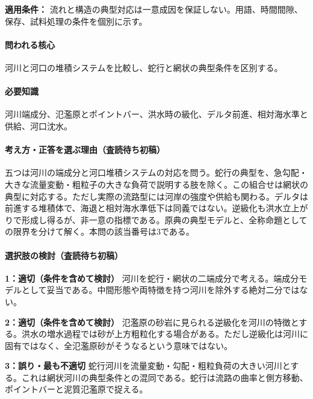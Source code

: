 \noindent\textbf{適用条件：} 流れと構造の典型対応は一意成因を保証しない。用語、時間間隙、保存、試料処理の条件を個別に示す。\par

\paragraph{問われる核心} 河川と河口の堆積システムを比較し、蛇行と網状の典型条件を区別する。

\paragraph{必要知識} 河川端成分、氾濫原とポイントバー、洪水時の級化、デルタ前進、相対海水準と供給、河口沈水。

\paragraph{考え方・正答を選ぶ理由（査読待ち初稿）} 五つは河川の端成分と河口堆積システムの対応を問う。蛇行の典型を、急勾配・大きな流量変動・粗粒子の大きな負荷で説明する肢を除く。この組合せは網状の典型に対応する。ただし実際の流路型には河岸の強度や供給も関わる。デルタは前進する堆積体で、海退と相対海水準低下は同義ではない。逆級化も洪水立上がりで形成し得るが、非一意の指標である。原典の典型モデルと、全称命題としての限界を分けて解く。本問の該当番号は3である。

\paragraph{選択肢の検討（査読待ち初稿）}\mbox{}\par

\noindent\textbf{1：適切（条件を含めて検討）} 河川を蛇行・網状の二端成分で考える。端成分モデルとして妥当である。中間形態や両特徴を持つ河川を除外する絶対二分ではない。\par

\noindent\textbf{2：適切（条件を含めて検討）} 氾濫原の砂岩に見られる逆級化を河川の特徴とする。洪水の増水過程では砂が上方粗粒化する場合がある。ただし逆級化は河川に固有ではなく、全氾濫原砂がそうなるという意味ではない。\par

\noindent\textbf{3：誤り・最も不適切} 蛇行河川を流量変動・勾配・粗粒負荷の大きい河川とする。これは網状河川の典型条件との混同である。蛇行は流路の曲率と側方移動、ポイントバーと泥質氾濫原で捉える。\par

